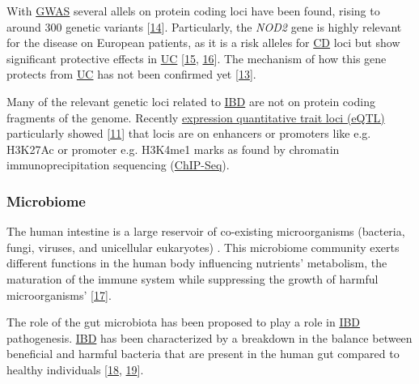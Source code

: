 \documentclass[
  12pt,
  a4paper,
  twoside,
  openright]{book}
\begin{document}
With \protect\hyperlink{acronyms_GWAS}{GWAS} several allels on protein coding loci have been found, rising to around 300 genetic variants {[}\protect\hyperlink{ref-kumar2019}{14}{]}.
Particularly, the \emph{NOD2} gene is highly relevant for the disease on European patients, as it is a risk alleles for \protect\hyperlink{acronyms_CD}{CD} loci but show significant protective effects in \protect\hyperlink{acronyms_UC}{UC} {[}\protect\hyperlink{ref-jostins2012}{15}, \protect\hyperlink{ref-momozawa2018}{16}{]}.
The mechanism of how this gene protects from \protect\hyperlink{acronyms_UC}{UC} has not been confirmed yet {[}\protect\hyperlink{ref-horowitz2021}{13}{]}.

Many of the relevant genetic loci related to \protect\hyperlink{acronyms_IBD}{IBD} are not on protein coding fragments of the genome.
Recently \protect\hyperlink{acronyms_eQTL}{expression quantitative trait loci (eQTL)} particularly showed {[}\protect\hyperlink{ref-mcgovern2015}{11}{]} that locis are on enhancers or promoters like e.g.
H3K27Ac or promoter e.g.
H3K4me1 marks as found by chromatin immunoprecipitation sequencing (\href{https://en.wikipedia.org/wiki/ChIP_sequencing}{ChIP-Seq}).

\hypertarget{microbiome}{%
\subsubsection{Microbiome}\label{microbiome}}

The human intestine is a large reservoir of co-existing microorganisms (bacteria, fungi, viruses, and unicellular eukaryotes) .
This microbiome community exerts different functions in the human body influencing nutrients' metabolism, the maturation of the immune system while suppressing the growth of harmful microorganisms' {[}\protect\hyperlink{ref-khanna2014}{17}{]}.

The role of the gut microbiota has been proposed to play a role in \protect\hyperlink{acronyms_IBD}{IBD} pathogenesis.
\protect\hyperlink{acronyms_IBD}{IBD} has been characterized by a breakdown in the balance between beneficial and harmful bacteria that are present in the human gut compared to healthy individuals {[}\protect\hyperlink{ref-swidsinski2002}{18}, \protect\hyperlink{ref-tamboli2004}{19}{]}.
\end{document}
